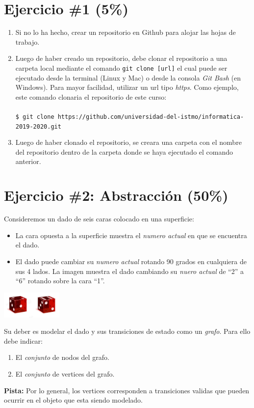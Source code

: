 \documentclass{article}
\begin{document}
\section*{Ejercicio \#1 (5\%)}
\begin{enumerate}
        \item{
                Si no lo ha hecho, crear un repositorio en Github para alojar
                las hojas de trabajo.}
        \item{
                Luego de haber creado un repositorio, debe clonar el repositorio
                a una carpeta local mediante el comando \texttt{git clone [url]} el cual
                puede ser ejecutado desde la terminal (Linux y Mac) o desde la consola
                \emph{Git Bash} (en Windows). Para mayor
                facilidad, utilizar un url tipo \emph{https}.
                Como ejemplo, este comando clonaria el repositorio de este curso: \\\\
                \texttt{\$ git clone https://github.com/universidad-del-istmo/informatica-2019-2020.git}
        }
        \item{
                Luego de haber clonado el repositorio, se creara una carpeta
                con el nombre del repositorio dentro de la carpeta donde se
                haya ejecutado el comando anterior.
        }
\end{enumerate}

\section*{Ejercicio \#2: Abstracci\'on (50\%)}
Consideremos un dado de seis caras colocado en una superficie:
\begin{itemize}
        \item{La cara opuesta a la superficie muestra el \emph{numero actual} en que se encuentra el dado.}
        \item{El dado puede cambiar su \emph{numero actual} rotando 90 grados en cualquiera de
        sus 4 lados. La imagen muestra el dado cambiando su \emph{nuero actual} de ``2'' a ``6''
        rotando sobre la cara ``1''.}
\end{itemize}
\begin{center}
\includegraphics[width=3cm]{die.png}
\end{center}
Su deber es modelar el dado y sus transiciones de estado como un \emph{grafo}. Para ello debe
indicar:
\begin{enumerate}
        \item{El \emph{conjunto} de nodos del grafo.}
        \item{El \emph{conjunto} de vertices del grafo.}
\end{enumerate}
{\bf Pista:} Por lo general, los vertices corresponden a transiciones validas que pueden
ocurrir en el objeto que esta siendo modelado.
\end{document}
